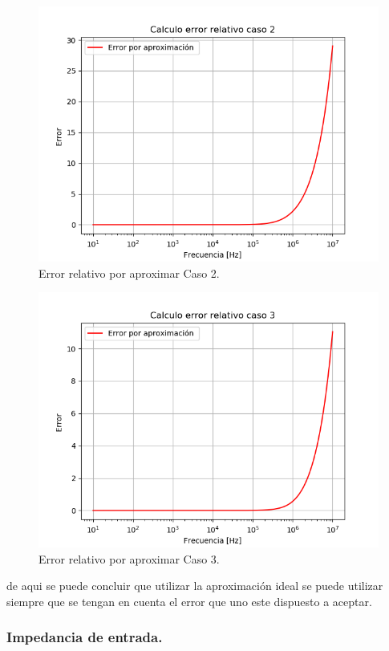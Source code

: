 \begin{figure}[H]	
	\centering
	\includegraphics[width=\textwidth]{Ejercicio1/Imagenes/error2.png}
	\caption{Error relativo por aproximar Caso 2.}
	\label{fig:e2}
\end{figure}
\begin{figure}[H]	
	\centering
	\includegraphics[width=\textwidth]{Ejercicio1/Imagenes/error3.png}
	\caption{Error relativo por aproximar Caso 3.}
	\label{fig:e3}
\end{figure}
de aqui se puede concluir que utilizar la aproximación ideal se puede utilizar siempre que se tengan en cuenta el error que uno este dispuesto a aceptar.
\subsubsection{Impedancia de entrada.}

